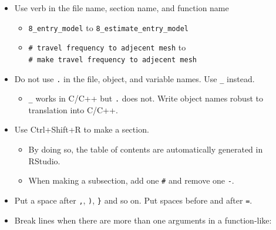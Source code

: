 \documentclass[
]{book}
\providecommand{\tightlist}{%
  \setlength{\itemsep}{0pt}\setlength{\parskip}{0pt}}
\begin{document}
\begin{itemize}
\tightlist
\item
  Use verb in the file name, section name, and function name

  \begin{itemize}
  \tightlist
  \item
    \texttt{8\_entry\_model} to \texttt{8\_estimate\_entry\_model}
  \item
    \texttt{\#\ travel\ frequency\ to\ adjecent\ mesh} to \texttt{\#\ make\ travel\ frequency\ to\ adjecent\ mesh}
  \end{itemize}
\item
  Do not use \texttt{.} in the file, object, and variable names. Use \texttt{\_} instead.

  \begin{itemize}
  \tightlist
  \item
    \texttt{\_} works in C/C++ but \texttt{.} does not. Write object names robust to translation into C/C++.
  \end{itemize}
\item
  Use Ctrl+Shift+R to make a section.

  \begin{itemize}
  \tightlist
  \item
    By doing so, the table of contents are automatically generated in RStudio.
  \item
    When making a subsection, add one \texttt{\#} and remove one \texttt{-}.
  \end{itemize}
\item
  Put a space after \texttt{,}, \texttt{)}, \texttt{\}} and so on. Put spaces before and after \texttt{=}.
\item
  Break lines when there are more than one arguments in a function-like:
\end{itemize}
\end{document}
